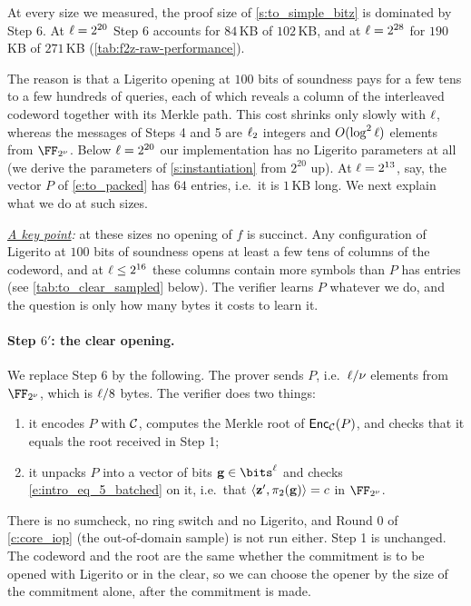 \documentclass[11pt,letterpaper,usenames,dvipsnames]{article}
\begin{document}
At every size we measured, the proof size of \cref{s:to_simple_bitz} is dominated by Step 6. At $\ell=2^{20}$ Step 6 accounts for $84$\,KB of $102$\,KB, and at $\ell=2^{28}$ for $190$\,KB of $271$\,KB (\cref{tab:f2z-raw-performance}).

The reason is that a Ligerito opening at $100$ bits of soundness pays for a few tens to a few hundreds of queries, each of which reveals a column of the interleaved codeword together with its Merkle path. This cost shrinks only slowly with $\ell$, whereas the messages of Steps 4 and 5 are $\ell_2$ integers and $O(\log^2\ell)$ elements from $\comfield$. Below $\ell=2^{20}$ our implementation has no Ligerito parameters at all (we derive the parameters of \cref{s:instantiation} from $2^{20}$ up). At $\ell=2^{13}$, say, the vector $P$ of \eqref{e:to_packed} has $64$ entries, i.e.\ it is $1$\,KB long. We next explain what we do at such sizes.

\medskip

\noindent \emph{\underline{A key point}:} at these sizes no opening of $f$ is succinct. Any configuration of Ligerito at $100$ bits of soundness opens at least a few tens of columns of the codeword, and at $\ell\le 2^{16}$ these columns contain more symbols than $P$ has entries (see \cref{tab:to_clear_sampled} below). The verifier learns $P$ whatever we do, and the question is only how many bytes it costs to learn it.

\paragraph{Step $6'$: the clear opening.} We replace Step 6 by the following. The prover sends $P$, i.e.\ $\ell/\nu$ elements from $\comfield$, which is $\ell/8$ bytes. The verifier does two things:
\begin{enumerate}[leftmargin=*,nosep]
    \item it encodes $P$ with $\mathcal{C}$, computes the Merkle root of $\mathsf{Enc}_{\mathcal{C}}(P)$, and checks that it equals the root received in Step 1;
    \item it unpacks $P$ into a vector of bits $\bfg\in\bits^\codedim$ and checks \eqref{e:intro_eq_5_batched} on it, i.e.\ that $\langle\mathbf{z}',\pi_2(\mathbf{g})\rangle=c$ in $\comfield$.
\end{enumerate}
There is no sumcheck, no ring switch and no Ligerito, and Round 0 of \cref{c:core_iop} (the out-of-domain sample) is not run either. Step 1 is unchanged. The codeword and the root are the same whether the commitment is to be opened with Ligerito or in the clear, so we can choose the opener by the size of the commitment alone, after the commitment is made.
\end{document}
